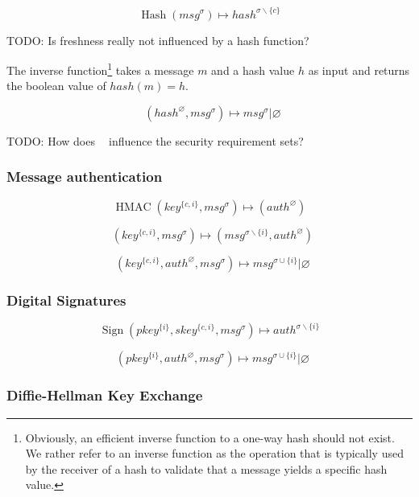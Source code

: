 \documentclass[a4paper]{article}
\DeclareMathOperator{\hash}{Hash}
\DeclareMathOperator{\hashvrfy}{Verify_{Hash}}
\DeclareMathOperator{\hmac}{HMAC}
\DeclareMathOperator{\hmacinline}{HMAC_{Inline}}
\DeclareMathOperator{\hmacvrfy}{Verify_{HMAC}}
\DeclareMathOperator{\sign}{Sign}
\DeclareMathOperator{\signvrfy}{Verify_{Sig}}
\newcommand{\TODO}[1]{\small\noindent\color{red} TODO: #1\color{black}}
\newcommand{\emptysec}{\varnothing}
\newcommand{\secminus}{\smallsetminus}
\begin{document}
$$\hash(msg^\sigma) \mapsto hash^{\sigma\secminus\{c\}}$$

\TODO{Is freshness really not influenced by a hash function?}

The inverse function\footnote{Obviously, an efficient inverse function to a
one-way hash should not exist. We rather refer to an inverse function as the
operation that is typically used by the receiver of a hash to validate that a
message yields a specific hash value.} takes a message $m$ and a hash
value $h$ as input and returns the boolean value of $hash(m) = h$.

$$\hashvrfy(hash^\emptysec, msg^\sigma) \mapsto msg^{\sigma} | \emptysec$$

\TODO{How does $\hashvrfy$ influence the security requirement sets?}

\subsubsection{Message authentication}

$$\hmac(key^{\{c,i\}}, msg^\sigma) \mapsto (auth^{\emptysec})$$

$$\hmacinline(key^{\{c,i\}}, msg^\sigma) \mapsto (msg^{\sigma\secminus{\{i\}}}, auth^{\emptysec})$$

$$\hmacvrfy(key^{\{c,i\}}, auth^\emptysec, msg^\sigma) \mapsto msg^{\sigma\cup\{i\}} | \emptysec$$

%

\subsubsection{Digital Signatures}

$$\sign(pkey^{\{i\}}, skey^{\{c,i\}}, msg^\sigma) \mapsto auth^{\sigma\secminus\{i\}}$$

$$\signvrfy(pkey^{\{i\}}, auth^{\emptysec}, msg^\sigma) \mapsto msg^{\sigma\cup\{i\}} | \emptysec$$

\subsubsection{Diffie-Hellman Key Exchange}
\end{document}
